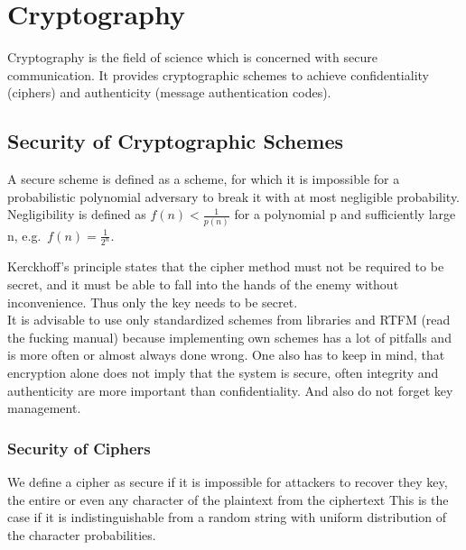 
\section{Cryptography}
Cryptography is the field of science which is concerned with secure communication.
It provides cryptographic schemes to achieve confidentiality (ciphers) and authenticity (message authentication codes).

\subsection{Security of Cryptographic Schemes}
A secure scheme is defined as a scheme, for which it is impossible for a probabilistic polynomial adversary to break it with at most negligible probability.
Negligibility is defined as $f(n) < \frac{1}{p(n)}$ for a polynomial p and sufficiently large n, e.g.\ $f(n) = \frac{1}{2^n}$.

Kerckhoff's principle states that the cipher method must not be required to be secret, and it must be able to fall into the hands of the enemy without inconvenience.
Thus only the key needs to be secret.\\

It is advisable to use only standardized schemes from libraries and RTFM (read the fucking manual) because implementing own schemes has a lot of pitfalls and is more often or almost always done wrong.
One also has to keep in mind, that encryption alone does not imply that the system is secure, often integrity and authenticity are more important than confidentiality.
And also do not forget key management.

\subsubsection*{Security of Ciphers}
We define a cipher as secure if it is impossible for attackers to recover they key, the entire or even any character of the plaintext from the ciphertext 
This is the case if it is indistinguishable from a random string with uniform distribution of the character probabilities.

